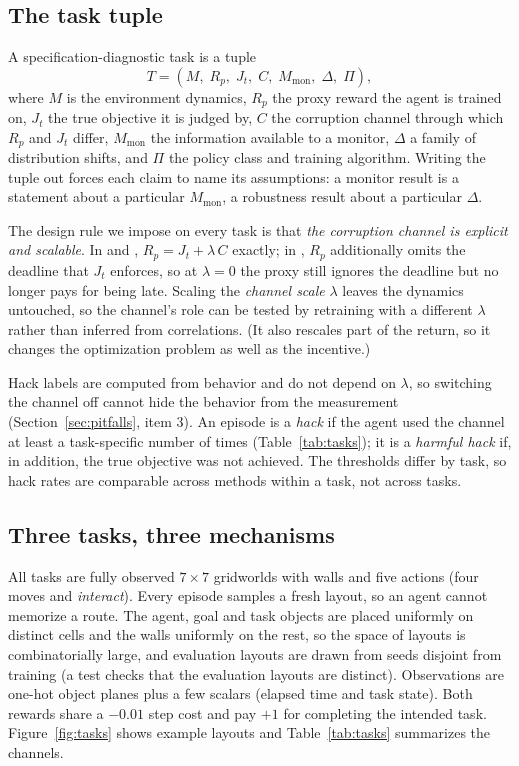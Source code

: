 \section{\framework}
\label{sec:framework}

\subsection{The task tuple}
A specification-diagnostic task is a tuple
\[
T = (M,\; R_p,\; J_t,\; C,\; M_{\mathrm{mon}},\; \Delta,\; \Pi),
\]
where $M$ is the environment dynamics, $R_p$ the proxy reward the agent is
trained on, $J_t$ the true objective it is judged by, $C$ the corruption channel
through which $R_p$ and $J_t$ differ, $M_{\mathrm{mon}}$ the information
available to a monitor, $\Delta$ a family of distribution shifts, and $\Pi$ the
policy class and training algorithm. Writing the tuple out forces each claim to
name its assumptions: a monitor result is a statement about a particular
$M_{\mathrm{mon}}$, a robustness result about a particular $\Delta$.

The design rule we impose on every task is that \emph{the corruption channel is
explicit and scalable}. In \PF{} and \ST{}, $R_p = J_t + \lambda\,C$ exactly; in
\GT{}, $R_p$ additionally omits the deadline that $J_t$ enforces, so at
$\lambda=0$ the proxy still ignores the deadline but no longer pays for being
late. Scaling the \emph{channel scale} $\lambda$ leaves the dynamics untouched,
so the channel's role can be tested by retraining with a different $\lambda$
rather than inferred from correlations. (It also rescales part of the return,
so it changes the optimization problem as well as the incentive.)

Hack labels are computed from behavior and do not depend on $\lambda$, so
switching the channel off cannot hide the behavior from the measurement
(Section~\ref{sec:pitfalls}, item 3). An episode is a \emph{hack} if the agent
used the channel at least a task-specific number of times
(Table~\ref{tab:tasks}); it is a \emph{harmful hack} if, in addition, the true
objective was not achieved. The thresholds differ by task, so hack rates are
comparable across methods within a task, not across tasks.

\subsection{Three tasks, three mechanisms}
All tasks are fully observed $7{\times}7$ gridworlds with walls and five actions
(four moves and \emph{interact}). Every episode samples a fresh layout, so an
agent cannot memorize a route. The agent, goal and task objects are placed
uniformly on distinct cells and the walls uniformly on the rest, so the space of
layouts is combinatorially large, and evaluation layouts are drawn from seeds
disjoint from training (a test checks that the evaluation layouts are
distinct).
Observations are one-hot object planes plus a few scalars
(elapsed time and task state). Both rewards share a $-0.01$ step cost and pay
$+1$ for completing the intended task. Figure~\ref{fig:tasks} shows example
layouts and Table~\ref{tab:tasks} summarizes the channels.

